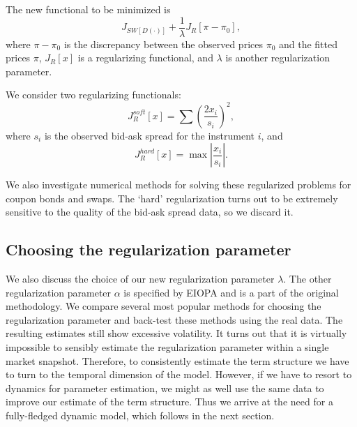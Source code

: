 \documentclass[a4paper]{iccf2017}
\begin{document}
The new functional to be minimized is
$$
J_{SW[D(\cdot)]} + \frac1\lambda J_R[\pi-\pi_0],
$$
where $\pi-\pi_0$ is the discrepancy between the observed prices $\pi_0$ and the fitted prices $\pi$, $J_R[x]$ is a regularizing functional, and $\lambda$ is another regularization parameter.

We consider two regularizing functionals: 
$$
J_R^{soft}[x]=\sum\left(\frac{2x_i}{s_i}\right)^2,
$$
where $s_i$ is the observed bid-ask spread for the instrument $i$, and
$$
J_R^{hard}[x]=\max\left|\frac{x_i}{s_i}\right|.
$$

We also investigate numerical methods for solving these regularized problems for coupon bonds and swaps. The `hard' regularization turns out to be extremely sensitive to the quality of the bid-ask spread data, so we discard it.

\subsection{Choosing the regularization parameter}
We also discuss the choice of our new regularization parameter $\lambda$. The other regularization parameter $\alpha$ is specified by EIOPA and is  a part of the original methodology. We compare several most popular methods for choosing the regularization parameter and back-test these methods using the real data. The resulting estimates still show excessive volatility. It turns out that it is virtually impossible to sensibly estimate the regularization parameter within a single market snapshot. Therefore, to consistently estimate the term structure we have to turn to the temporal dimension of the model. However, if we have to resort to dynamics for parameter estimation, we might as well use the same data to improve our estimate of the term structure. Thus we arrive at the need for a fully-fledged dynamic model, which follows in the next section.
\end{document}
